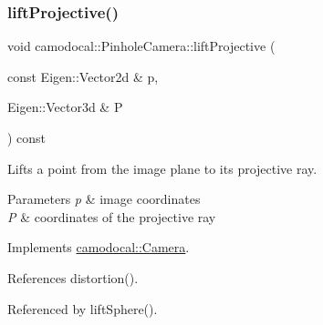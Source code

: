 \subsubsection{\texorpdfstring{lift\+Projective()}{liftProjective()}}
{\footnotesize\ttfamily void camodocal\+::\+Pinhole\+Camera\+::lift\+Projective (\begin{DoxyParamCaption}\item[{const Eigen\+::\+Vector2d \&}]{p,  }\item[{Eigen\+::\+Vector3d \&}]{P }\end{DoxyParamCaption}) const\hspace{0.3cm}{\ttfamily [virtual]}}



Lifts a point from the image plane to its projective ray. 


\begin{DoxyParams}{Parameters}
{\em p} & image coordinates \\
\hline
{\em P} & coordinates of the projective ray \\
\hline
\end{DoxyParams}


Implements \hyperlink{classcamodocal_1_1Camera_a680e97bfecab33cd833f914ee811d12d}{camodocal\+::\+Camera}.



References distortion().



Referenced by lift\+Sphere().

